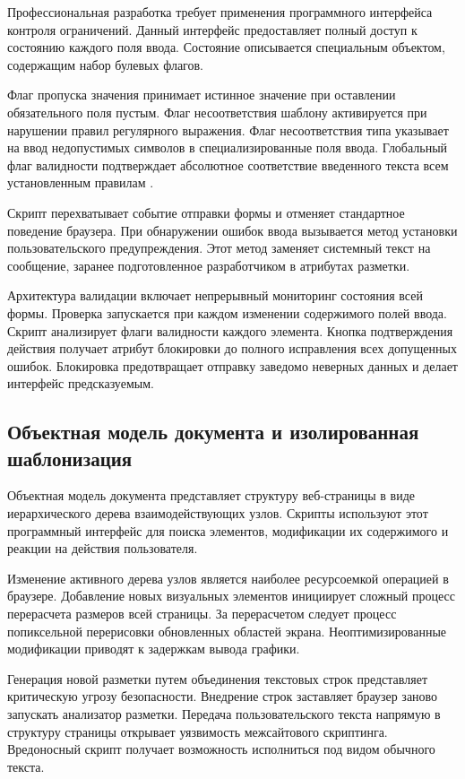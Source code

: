 \documentclass[bachelor, och, pract, times]{SCWorks}
\begin{document}
Профессиональная разработка требует применения программного интерфейса контроля
ограничений. Данный интерфейс предоставляет полный доступ к состоянию каждого
поля ввода. Состояние описывается специальным объектом, содержащим набор
булевых флагов.

Флаг пропуска значения принимает истинное значение при оставлении обязательного
поля пустым. Флаг несоответствия шаблону активируется при нарушении правил
регулярного выражения. Флаг несоответствия типа указывает на ввод недопустимых
символов в специализированные поля ввода. Глобальный флаг валидности
подтверждает абсолютное соответствие введенного текста всем установленным
правилам \cite{mdn_validity_state}.

Скрипт перехватывает событие отправки формы и отменяет стандартное поведение
браузера. При обнаружении ошибок ввода вызывается метод установки
пользовательского предупреждения. Этот метод заменяет системный текст на
сообщение, заранее подготовленное разработчиком в атрибутах разметки.

Архитектура валидации включает непрерывный мониторинг состояния всей формы.
Проверка запускается при каждом изменении содержимого полей ввода. Скрипт
анализирует флаги валидности каждого элемента. Кнопка подтверждения действия
получает атрибут блокировки до полного исправления всех допущенных ошибок.
Блокировка предотвращает отправку заведомо неверных данных и делает интерфейс
предсказуемым.

\subsection{Объектная модель документа и изолированная шаблонизация}
Объектная модель документа представляет структуру веб-страницы в виде
иерархического дерева взаимодействующих узлов. Скрипты используют этот
программный интерфейс для поиска элементов, модификации их содержимого и
реакции на действия пользователя.

Изменение активного дерева узлов является наиболее ресурсоемкой операцией в
браузере. Добавление новых визуальных элементов инициирует сложный процесс
перерасчета размеров всей страницы. За перерасчетом следует процесс
попиксельной перерисовки обновленных областей экрана. Неоптимизированные
модификации приводят к задержкам вывода графики.

Генерация новой разметки путем объединения текстовых строк представляет
критическую угрозу безопасности. Внедрение строк заставляет браузер заново
запускать анализатор разметки. Передача пользовательского текста напрямую в
структуру страницы открывает уязвимость межсайтового скриптинга. Вредоносный
скрипт получает возможность исполниться под видом обычного текста.
\end{document}
